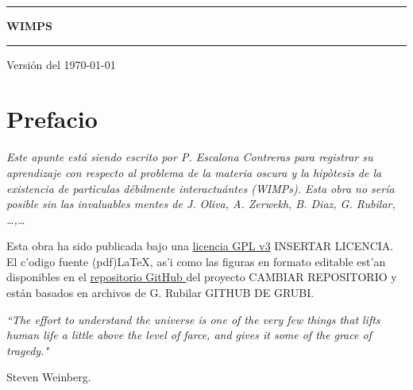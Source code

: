 \documentclass[letterpaper,11pt]{report}
\begin{document}
\sffamily

\thispagestyle{empty}
\begin{center}



\vspace{6.5cm}

\rule{15cm}{0.1cm}

\vspace{1.5cm}

{\huge \textsc{\textbf{WIMPS}}}

\vspace{1.5cm}

\rule{15cm}{0.1cm}

\vspace{1.5cm}

Versión del \today

\end{center}

\newpage
\thispagestyle{empty}
\newpage
\setcounter{page}{1}

\pagestyle{plain}
\chapter*{Prefacio}
\bigskip
\bigskip
\bigskip
\bigskip
\bigskip
\bigskip


\emph{Este apunte está siendo escrito por P. Escalona Contreras para registrar su aprendizaje con respecto al \textit{problema de la materia oscura} y la hipòtesis de la existencia de \textit{partìculas débilmente interactuántes} (WIMPs). Esta obra no sería posible sin las invaluables mentes de J. Oliva, A. Zerwekh, B. Diaz, G. Rubilar,  \dots,\dots}

\bigskip


\bigskip

Esta obra ha sido publicada bajo una \href{https://github.com/gfrubi/electrodinamica/blob/master/LICENSE}{licencia GPL v3} INSERTAR LICENCIA. El c'odigo fuente (pdf)\LaTeX, as'i como las figuras en formato editable est'an disponibles en el \href{https://github.com/gfrubi/electrodinamica}{repositorio GitHub }del proyecto CAMBIAR REPOSITORIO y están basados en archivos de G. Rubilar GITHUB DE GRUBI.
\bigskip
\bigskip
\bigskip
\bigskip
\bigskip
\bigskip



\emph{\textquotedblleft The effort to understand the universe is one of the very few things that lifts human life a little above the level of farce, and gives it some of the grace of tragedy."}

\begin{flushright}
Steven Weinberg.
\end{flushright}

\newpage

\tableofcontents
{}
\setcounter{page}{1}







\end{document}
